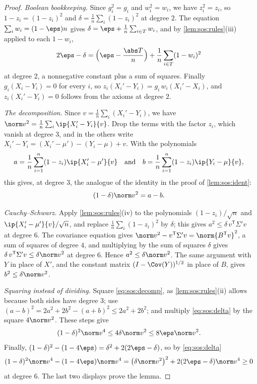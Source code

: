 \begin{refsection}
\begin{proof}
\emph{Boolean bookkeeping.} Since $g_i^2=g_i$ and $w_i^2=w_i$, we have $z_i^2=z_i$, so $1-z_i=(1-z_i)^2$ and $\delta=\frac1n\sum_i(1-z_i)^2$ at degree $2$. The equation $\sum_iw_i=(1-\eps)n$ gives $\delta=\eps+\frac1n\sum_{i\in T}w_i$, and by \cref{lem:sos:rules}(iii) applied to each $1-w_i$,
\begin{equation}\label{eq:sos:delta}
  2\eps-\delta=\Bigl(\eps-\frac{\abs T}{n}\Bigr)+\frac1n\sum_{i\in T}(1-w_i)^2
\end{equation}
at degree $2$, a nonnegative constant plus a sum of squares. Finally $g_i(X_i-Y_i)=0$ for every $i$, so $z_i(X_i'-Y_i)=g_i\,w_i(X_i'-X_i)$, and $z_i(X_i'-Y_i)=0$ follows from the axioms at degree $2$.

\emph{The decomposition.} Since $v=\frac1n\sum_i(X_i'-Y_i)$, we have $\norm v^2=\frac1n\sum_i\ip{X_i'-Y_i}{v}$. Drop the terms with the factor $z_i$, which vanish at degree $3$, and in the others write $X_i'-Y_i=(X_i'-\mu')-(Y_i-\mu)+v$. With the polynomials
\[
  a=\frac1n\sum_{i=1}^n(1-z_i)\ip{X_i'-\mu'}{v}\quad\text{and}\quad b=\frac1n\sum_{i=1}^n(1-z_i)\ip{Y_i-\mu}{v},
\]
this gives, at degree $3$, the analogue of the identity in the proof of \cref{lem:sos:ident}:
\begin{equation}\label{eq:sos:decomp}
  (1-\delta)\norm v^2=a-b.
\end{equation}

\emph{Cauchy--Schwarz.} Apply \cref{lem:sos:rules}(iv) to the polynomials $(1-z_i)/\sqrt n$ and $\ip{X_i'-\mu'}{v}/\sqrt n$, and replace $\frac1n\sum_i(1-z_i)^2$ by $\delta$; this gives $a^2\le\delta\, v^{\mathsf T}\Sigma'v$ at degree $6$. The covariance equation gives $\norm v^2-v^{\mathsf T}\Sigma'v=\norm{B^{\mathsf T}v}^2$, a sum of squares of degree $4$, and multiplying by the sum of squares $\delta$ gives $\delta\,v^{\mathsf T}\Sigma'v\le\delta\norm v^2$ at degree $6$. Hence $a^2\le\delta\norm v^2$. The same argument with $Y$ in place of $X'$, and the constant matrix $(I-\Cov(Y))^{1/2}$ in place of $B$, gives $b^2\le\delta\norm v^2$.

\emph{Squaring instead of dividing.} Square \eqref{eq:sos:decomp}, as \cref{lem:sos:rules}(ii) allows because both sides have degree $3$; use $(a-b)^2=2a^2+2b^2-(a+b)^2\le2a^2+2b^2$; and multiply \eqref{eq:sos:delta} by the square $4\norm v^2$. These steps give
\[
  (1-\delta)^2\norm v^4\le4\delta\norm v^2\le8\eps\norm v^2.
\]
Finally, $(1-\delta)^2-(1-4\eps)=\delta^2+2(2\eps-\delta)$, so by \eqref{eq:sos:delta}
\[
  (1-\delta)^2\norm v^4-(1-4\eps)\norm v^4=\bigl(\delta\norm v^2\bigr)^2+2(2\eps-\delta)\norm v^4\ge0
\]
at degree $6$. The last two displays prove the lemma.
\end{proof}


\end{refsection}
